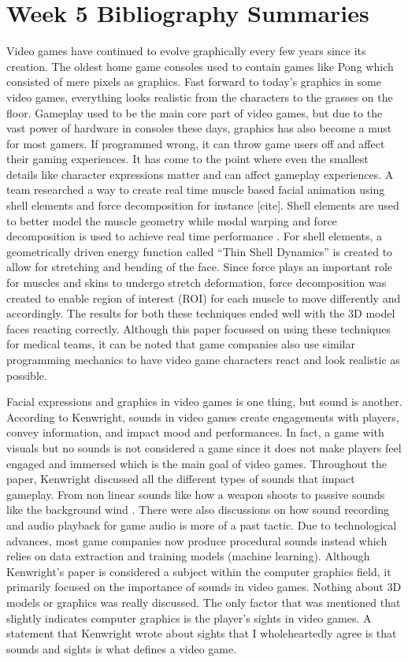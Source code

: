 \documentclass{article}
\begin{document}
\section{Week 5 Bibliography Summaries}

Video games have continued to evolve graphically every few years since its creation. The oldest home game consoles used to contain games like Pong which consisted of mere pixels as graphics. Fast forward to today's graphics in some video games, everything looks realistic from the characters to the grasses on the floor. Gameplay used to be the main core part of video games, but due to the vast power of hardware in consoles these days, graphics has also become a must for most gamers. If programmed wrong, it can throw game users off and affect their gaming experiences.  It has come to the point where even the smallest details like character expressions matter and can affect gameplay experiences. A team researched a way to create real time muscle based facial animation using shell elements and force decomposition for instance [cite]. Shell elements are used to better model the muscle geometry while modal warping and force decomposition is used to achieve real time performance \cite{10.1145/3384382.3384531}. For shell elements, a geometrically driven energy function called “Thin Shell Dynamics” is created to allow for stretching and bending of the face. Since force plays an important role for muscles and skins to undergo stretch deformation, force decomposition was created to enable region of interest (ROI) for each muscle to move differently and accordingly. The results for both these techniques ended well with the 3D model faces reacting correctly. Although this paper focussed on using these techniques for medical teams, it can be noted that game companies also use similar programming mechanics to have video game characters react and look realistic as possible.	

Facial expressions and graphics in video games is one thing, but sound is another. According to Kenwright, sounds in video games create engagements with players, convey information, and impact mood and performances. In fact, a game with visuals but no sounds is not considered a game since it does not make players feel engaged and immersed which is the main goal of video games. Throughout the paper, Kenwright discussed all the different types of sounds that impact gameplay. From non linear sounds like how a weapon shoots to passive sounds like the background wind \cite{9098089}. There were also discussions on how sound recording and audio playback for game audio is more of a past tactic. Due to technological advances, most game companies now produce procedural sounds instead which relies on data extraction and training models (machine learning). Although Kenwright’s paper is considered a subject within the computer graphics field, it primarily focused on the importance of sounds in video games. Nothing about 3D models or graphics was really discussed. The only factor that was mentioned that slightly indicates computer graphics is the player’s sights in video games. A statement that Kenwright wrote about sights that I wholeheartedly agree is that sounds and sights is what defines a video game.
\end{document}
